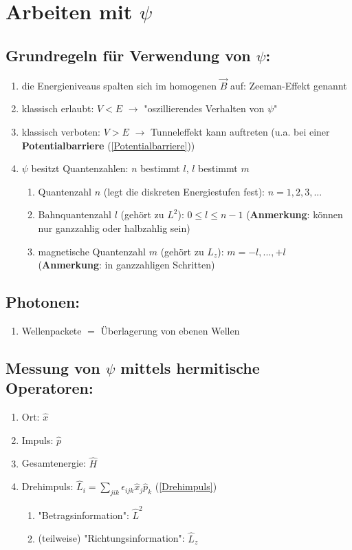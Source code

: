 \section{Arbeiten mit $\psi$}

\subsection{Grundregeln für Verwendung von $\psi$:}
\begin{enumerate}
    \item die Energieniveaus spalten sich im homogenen $\vec{B}$ auf: Zeeman-Effekt genannt
    \item klassisch erlaubt: $V<E$ $\rightarrow$ "oszillierendes Verhalten von $\psi$"
    \item klassisch verboten: $V>E$ $\rightarrow$ Tunneleffekt kann auftreten (u.a. bei einer \textbf{Potentialbarriere} (\ref{Potentialbarriere}))
    \item $\psi$ besitzt Quantenzahlen: $n$ bestimmt $l$, $l$ bestimmt $m$
    \begin{enumerate}
        \item Quantenzahl $n$ (legt die diskreten Energiestufen fest): $n=1,2,3,...$
        \item Bahnquantenzahl $l$ (gehört zu $L^2$): $0\leq l\leq n-1$ (\textbf{Anmerkung}: können nur ganzzahlig oder halbzahlig sein)
        \item magnetische Quantenzahl $m$ (gehört zu $L_z$): $m=-l,...,+l$ (\textbf{Anmerkung}: in ganzzahligen Schritten)
    \end{enumerate}
\end{enumerate}

\subsection{Photonen:}
\begin{enumerate}
    \item Wellenpackete $=$ Überlagerung von ebenen Wellen
\end{enumerate}

\subsection{Messung von $\psi$ mittels hermitische Operatoren:} \label{Operatoren}
\begin{enumerate}
    \item Ort: $\hat{x}$
    \item Impuls: $\hat{p}$
    \item Gesamtenergie: $\hat{H}$
    \item Drehimpuls: $\hat{L}_i=\sum_{jik}\epsilon_{ijk}\hat{x}_j\hat{p}_k$ (\ref{Drehimpuls})
    \begin{enumerate}
        \item "Betragsinformation": $\hat{L}^2$
        \item (teilweise) "Richtungsinformation": $\hat{L}_z$
    \end{enumerate}

\end{enumerate}

